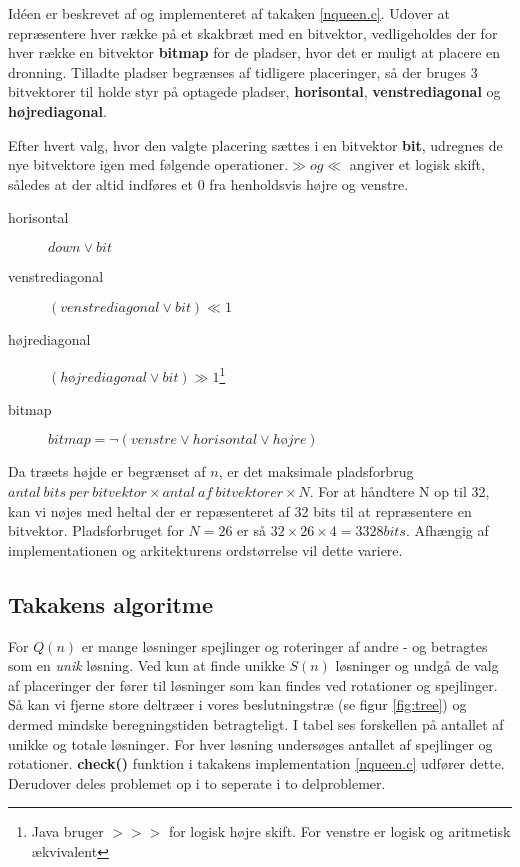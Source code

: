 \documentclass[pdf,draft,a4paper,11pt]{article}
\begin{document}
Idéen er beskrevet af \cite{Zongyan02} og implementeret af takaken \ref{nqueen.c}. Udover at repræsentere hver række på et skakbræt med en bitvektor, vedligeholdes der for hver række  en bitvektor \textbf{bitmap} for de pladser, hvor det er muligt at placere en dronning.  Tilladte pladser begrænses af tidligere placeringer, så der bruges 3 bitvektorer til holde styr på optagede pladser, \textbf{horisontal}, \textbf{venstrediagonal}  og \textbf{højrediagonal}.

Efter hvert valg, hvor den valgte placering sættes i en bitvektor \textbf{bit}, udregnes de nye bitvektore igen med følgende operationer.$\gg og \ll$ angiver et logisk skift, således at der altid indføres et $0$ fra henholdsvis højre og venstre.
\begin{description}
	\item[horisontal] $down \lor bit$ 
	\item[venstrediagonal] $(venstrediagonal \lor bit) \ll 1$
	\item[højrediagonal] $(højrediagonal \lor bit) \gg  1$\footnote{Java bruger $>>>$ for logisk højre skift. For venstre er logisk og aritmetisk ækvivalent}
	\item[bitmap]	$bitmap = \lnot(venstre \lor horisontal \lor højre)$	
\end{description}

Da træets højde er begrænset af $n$, er det maksimale pladsforbrug $antal\ bits\ per\ bitvektor \times antal\ af\ bitvektorer \times N$. For at håndtere N op til 32, kan vi nøjes med heltal der er repæsenteret af 32 bits til at repræsentere en bitvektor. Pladsforbruget for $N=26$ er så $32\times 26 \times 4 = 3328 bits$. Afhængig af implementationen og arkitekturens ordstørrelse vil dette variere. 

\subsection{Takakens algoritme}\label{takalgo}

For $Q(n)$ er mange løsninger spejlinger og roteringer af andre - og betragtes som en \emph{unik} løsning. Ved kun at finde unikke $S(n)$ løsninger og undgå de valg af placeringer der fører til løsninger som kan findes ved rotationer og spejlinger. Så kan vi fjerne store deltræer i vores beslutningstræ (se figur \ref{fig:tree}) og dermed mindske beregningstiden betragteligt. I tabel  ses forskellen på antallet af unikke og totale løsninger. For hver løsning undersøges antallet af spejlinger og rotationer. \textbf{check()} funktion i takakens implementation \ref{nqueen.c} udfører dette. Derudover deles problemet op i to seperate i to delproblemer. 
\end{document}
